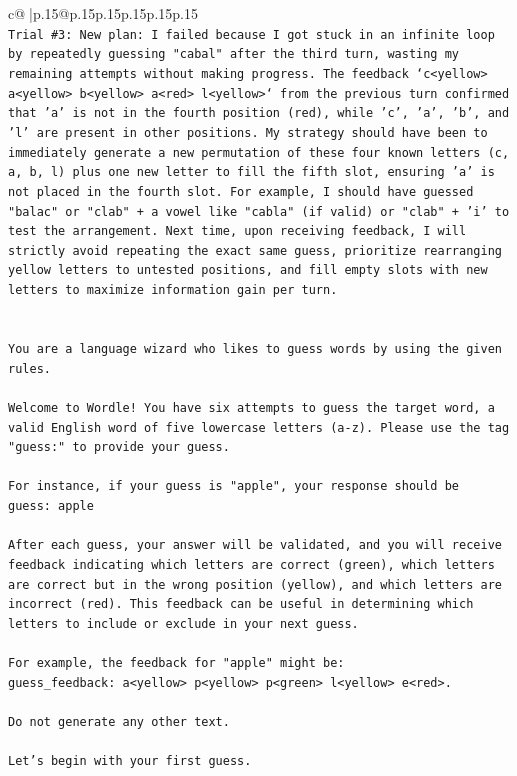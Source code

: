 \documentclass{article}
\begin{document}
{\begin{supertabular}{c@{$\;$}|p{.15\linewidth}@{}p{.15\linewidth}p{.15\linewidth}p{.15\linewidth}p{.15\linewidth}p{.15\linewidth}}
{{{\\ 
\texttt{Trial \#3: New plan: I failed because I got stuck in an infinite loop by repeatedly guessing "cabal" after the third turn, wasting my remaining attempts without making progress. The feedback `c<yellow> a<yellow> b<yellow> a<red> l<yellow>` from the previous turn confirmed that 'a' is not in the fourth position (red), while 'c', 'a', 'b', and 'l' are present in other positions. My strategy should have been to immediately generate a new permutation of these four known letters (c, a, b, l) plus one new letter to fill the fifth slot, ensuring 'a' is not placed in the fourth slot. For example, I should have guessed "balac" or "clab" + a vowel like "cabla" (if valid) or "clab" + 'i' to test the arrangement. Next time, upon receiving feedback, I will strictly avoid repeating the exact same guess, prioritize rearranging yellow letters to untested positions, and fill empty slots with new letters to maximize information gain per turn.} \\
\\ 
\\ 
\texttt{You are a language wizard who likes to guess words by using the given rules.} \\
\\ 
\texttt{Welcome to Wordle! You have six attempts to guess the target word, a valid English word of five lowercase letters (a{-}z). Please use the tag "guess:" to provide your guess.} \\
\\ 
\texttt{For instance, if your guess is "apple", your response should be} \\
\texttt{guess: apple} \\
\\ 
\texttt{After each guess, your answer will be validated, and you will receive feedback indicating which letters are correct (green), which letters are correct but in the wrong position (yellow), and which letters are incorrect (red). This feedback can be useful in determining which letters to include or exclude in your next guess.} \\
\\ 
\texttt{For example, the feedback for "apple" might be:} \\
\texttt{guess\_feedback: a<yellow> p<yellow> p<green> l<yellow> e<red>.} \\
\\ 
\texttt{Do not generate any other text.} \\
\\ 
\texttt{Let's begin with your first guess.} \\
            }
        }
    }
     \\ \\


\end{supertabular}}
\end{document}

